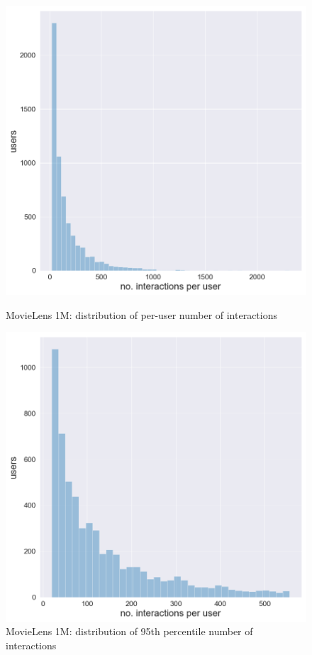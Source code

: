 \begin{figure}[htbp]
    \begin{minipage}{0.48\textwidth}
    \centering
      \includegraphics[width=\textwidth]{datasets/Movielens1M_user_interaction_distr.png}
      \caption{MovieLens 1M: distribution of per-user number of interactions}
      \label{fig:ml1m_dist}
    \end{minipage}
    \hfill
    \begin{minipage}{0.48\textwidth}
    \centering
     \includegraphics[width=\textwidth]{datasets/Movielens1M_95th_interaction_distr.png} 
     \caption{MovieLens 1M: distribution of 95th percentile number of interactions}
      \label{fig:ml1m_dist_95}
    \end{minipage}
\end{figure}


